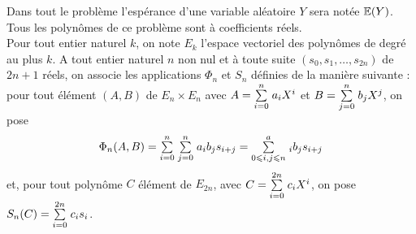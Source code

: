 \documentclass[11pt]{article}%
\begin{document}
\noindent Dans tout le problème l'espérance d'une variable aléatoire
$Y$
sera notée $\mathbb{E}(Y)$. Tous les polynômes de ce problème sont à
coefficients réels.\\
Pour tout entier naturel $k$, on note $E_{k}$ l'espace vectoriel des
polynômes de degré au plus $k$. A tout entier naturel $n$ non nul et à
toute suite
$(s_{0},s_{1},\dots,s_{2n})$ de $2n + 1$ réels, on associe les
applications $\Phi_{n}$ et $S_{n}$ définies de la manière suivante :\\
pour tout élément $(A,B)$ de $E_{n}\times E_{n}$ avec $A = {\textstyle\sum\limits_{i =
0}^{n}}\hspace{.1cm}a_{i}X^{i}$ et $B = {\textstyle\sum\limits_{j = 0}^{n}}\hspace{.1cm}b_{j}X^{j}$, on pose
\[
\Phi
_{n}(A,B) = {\textstyle\sum\limits_{i = 0}^{n}}\hspace{.1cm}{\textstyle\sum\limits_{j = 0}^{n}}\hspace{.1cm}a_{i}b_{j}s_{i + j} =
{\textstyle\sum\limits_{0\leqslant
i,j\leqslant n}^{a}}\hspace{.1cm}_{i}b_{j}s_{i + j}
\]
et, pour tout polynôme $C$ élément de $E_{2n}$, avec $C = {\textstyle\sum\limits_{i =
0}^{2n}}\hspace{.1cm}c_{i}X^{i}$, on pose $S_{n}(C) = {\textstyle\sum\limits_{i = 0}^{2n}}\hspace{.1cm}c_{i}s_{i}$.
\end{document}
